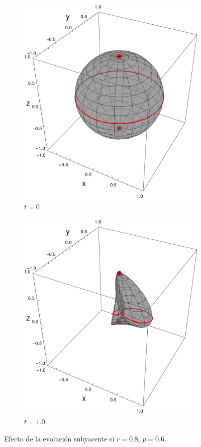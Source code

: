 \begin{figure}[h!]
    \centering
    \begin{subfigure}{0.45\textwidth}
      \centering
      \includegraphics[width=0.9\linewidth]{maxent/figures/sphere_CNOT_t=0.0_z=0.8_p=0.6.png}
      \caption{$t=0$}
    \end{subfigure}%
    \begin{subfigure}{0.45\textwidth}
      \centering
      \includegraphics[width=0.9\linewidth]{maxent/figures/sphere_CNOT_t=1.0_z=0.8_p=0.6.png}
      \caption{$t=1.0$}
    \end{subfigure}
    \caption{Efecto de la evolución subyacente si $r=0.8$, $p=0.6$.}
    \label{fig:CNOTsequence2}
\end{figure}